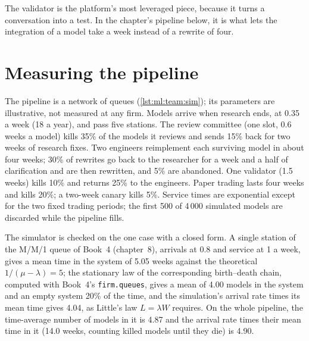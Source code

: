 The validator is the platform's most leveraged piece, because it turns a conversation into a test. In the chapter's pipeline
below, it is what lets the integration of a model take a week instead of a rewrite of four.

\section{Measuring the pipeline}

The pipeline is a network of queues (\cref{lst:ml:team:sim}); its parameters are illustrative, not measured at any firm. Models arrive when research ends, at 0.35 a week (18 a year), and
pass five stations. The review committee (one slot, 0.6 weeks a model) kills 35\% of the models it reviews and sends 15\% back
for two weeks of research fixes. Two engineers reimplement each surviving model in about four weeks; 30\% of rewrites go back to
the researcher for a week and a half of clarification and are then rewritten, and 5\% are abandoned. One validator (1.5 weeks)
kills 10\% and returns 25\% to the engineers. Paper trading lasts four weeks and kills 20\%; a two-week canary kills 5\%. Service
times are exponential except for the two fixed trading periods; the first 500 of 4\,000 simulated models are discarded while the
pipeline fills.

The simulator is checked on the one case with a closed form. A single station of the M/M/1 queue of Book~4 (chapter~8), arrivals
at 0.8 and service at 1 a week, gives a mean time in the system of 5.05 weeks against the theoretical $1/(\mu-\lambda)=5$; the
stationary law of the corresponding birth--death chain, computed with Book~4's \texttt{firm.queues}, gives a mean of 4.00 models in
the system and an empty system 20\% of the time, and the simulation's arrival rate times its mean time gives 4.04, as Little's law
$L=\lambda W$ requires. On the whole pipeline, the time-average number of models in it is 4.87 and the arrival rate times their
mean time in it (14.0 weeks, counting killed models until they die) is 4.90.

